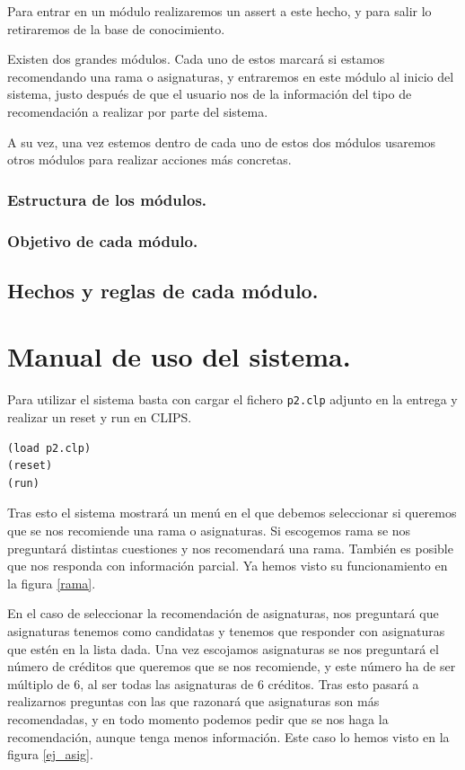 \documentclass[12pt, spanish]{article}
\begin{document}
Para entrar en un módulo realizaremos un assert a este hecho, y para salir lo retiraremos de la base de conocimiento.

Existen dos grandes módulos. Cada uno de estos marcará si estamos recomendando una rama o asignaturas, y entraremos en este módulo al inicio del sistema, justo después de que el usuario nos de la información del tipo de recomendación a realizar por parte del sistema.

A su vez, una vez estemos dentro de cada uno de estos dos módulos usaremos otros módulos para realizar acciones más concretas.

\subsubsection{Estructura de los módulos.}

\subsubsection{Objetivo de cada módulo.}


\subsection{Hechos y reglas de cada módulo.}


\newpage

\section{Manual de uso del sistema.}

Para utilizar el sistema basta con cargar el fichero \texttt{p2.clp} adjunto en la entrega y realizar un reset y run en CLIPS.

\begin{lstlisting}
(load p2.clp)
(reset)
(run)
\end{lstlisting}

Tras esto el sistema mostrará un menú en el que debemos seleccionar si queremos que se nos recomiende una rama o asignaturas. Si escogemos rama se nos preguntará distintas cuestiones y nos recomendará una rama. También es posible que nos responda con información parcial. Ya hemos visto su funcionamiento en la figura \ref{rama}.


En el caso de seleccionar la recomendación de asignaturas, nos preguntará que asignaturas tenemos como candidatas y tenemos que responder con asignaturas que estén en la lista dada. Una vez escojamos asignaturas se nos preguntará el número de créditos que queremos que se nos recomiende, y este número ha de ser múltiplo de 6, al ser todas las asignaturas de 6 créditos. Tras esto pasará a realizarnos preguntas con las que razonará que asignaturas son más recomendadas, y en todo momento podemos pedir que se nos haga la recomendación, aunque tenga menos información. Este caso lo hemos visto en la figura \ref{ej_asig}.
\end{document}
